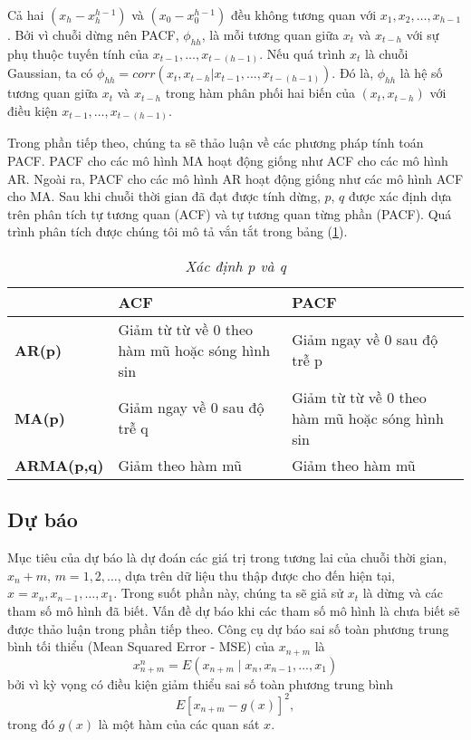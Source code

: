\documentclass[12pt, a4paper,oneside]{book}
\theoremstyle{definition}
\begin{document}
Cả hai $(x_h-x_h^{h-1})$ và $(x_0-x_0^{h-1})$ đều không tương quan với ${x_1,x_2,\dots,x_{h-1}}$. Bởi vì chuỗi dừng nên PACF, $\phi_{hh}$, là mỗi tương quan giữa $x_t$ và $x_{t-h}$ với sự phụ thuộc tuyến tính của ${x_{t-1},\dots,x_{t-(h-1)}}$. Nếu quá trình $x_t$ là chuỗi Gaussian, ta có $\phi_{hh}=corr(x_t,x_{t-h}| x_{t-1},\dots, x_{t-(h-1)})$. Đó là, $\phi_{hh}$ là hệ số tương quan giữa $x_t$ và $x_{t-h}$ trong hàm phân phối hai biến của $(x_t,x_{t-h})$ với điều kiện ${x_{t-1},\dots,x_{t-(h-1)}}$.

Trong phần tiếp theo, chúng ta sẽ thảo luận về các phương pháp tính toán PACF. PACF cho các mô hình MA hoạt động giống như ACF cho các mô hình AR. Ngoài ra, PACF cho các mô hình AR hoạt động giống như các mô hình ACF cho MA. Sau khi chuỗi thời gian đã đạt được tính dừng, $p$, $q$ được xác định dựa trên phân tích tự tương quan (ACF) và tự tương quan từng phần (PACF). Quá trình phân tích được chúng tôi mô tả vắn tắt trong bảng (\ref{b1}).
\begin{table}[h!]
	\centering
	\begin{tabular}{|p{2.5cm}|p{6cm}|p{6cm}|}
	\hline 
	&\textbf{ACF }&\textbf{PACF }\\
	\hline
\textbf{AR(p)} &Giảm từ từ về 0 theo hàm mũ hoặc sóng hình sin & Giảm ngay về 0 sau độ trễ p\\
\hline
\textbf{MA(p)} &Giảm ngay về 0 sau độ trễ q &Giảm từ từ về 0 theo hàm mũ hoặc sóng hình sin \\
  \hline
\textbf{ARMA(p,q)} &Giảm theo hàm mũ &Giảm theo hàm mũ \\
 \hline
	\end{tabular}
\caption{\textit{Xác định p và q}}
\label{b1} 
\end{table}

\subsection{Dự báo}
Mục tiêu của dự báo là dự đoán các giá trị trong tương lai của chuỗi thời gian, $x_{n} + m $, $m =1, 2 ,\dots$, dựa trên dữ liệu thu thập được cho đến hiện tại, $x = {x_{n}, x_{n-1},\dots, x_{1}}$. Trong suốt phần này, chúng ta sẽ giả sử $x_t$ là dừng và các tham số mô hình đã biết. Vấn đề dự báo khi các tham số mô hình là chưa biết sẽ được thảo luận trong phần tiếp theo. Công cụ dự báo sai số toàn phương trung bình tối thiểu (Mean Squared Error - MSE) của $x_{n+m}$ là 
$$x_{n+m}^n= E (x_{n+m}\mid x_{n},x_{n-1},...,x_{1})$$ bởi vì kỳ vọng có điều kiện giảm thiểu sai số toàn phương trung bình 
\begin{equation}
E[x_{n+m} - g(x)]^2, \label{ct1.133}
\end{equation}
trong đó $g(x)$ là một hàm của các quan sát $x$.
\end{document}

